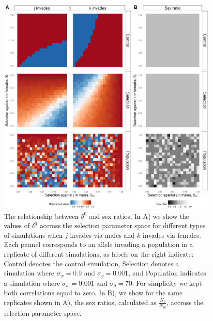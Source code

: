 \documentclass[12pt]{article}
\begin{document}
\begin{figure}[H]
  \centerline{\includegraphics[width=1\textwidth]{ratios.pdf}}
  \caption{The relationship between $\delta^{0}$ and sex ratios. In A) we show the values of $\delta^{0}$ accross the selection parameter space for different types of simulations when $j$ invades via males and $k$ invades via females. Each pannel corresponds to an allele invading a population in a replicate of different simulations, as labels on the right indicate: Control denotes the control simulation, Selection denotes a simulation where $\sigma_{w}=0.9$ and $\sigma_{g}=0.001$, and Population indicates a simulation where $\sigma_{w}=0.001$ and $\sigma_{g}=70$. For simplicity we kept both correlations equal to zero. In B), we show for the same replicates shown in A), the sex ratios, calculated as $\frac{N_{f}}{N_{m}}$, accross the selection parameter space.   }
    \label{fig:ratios}
\end{figure}



\clearpage


\end{document}
